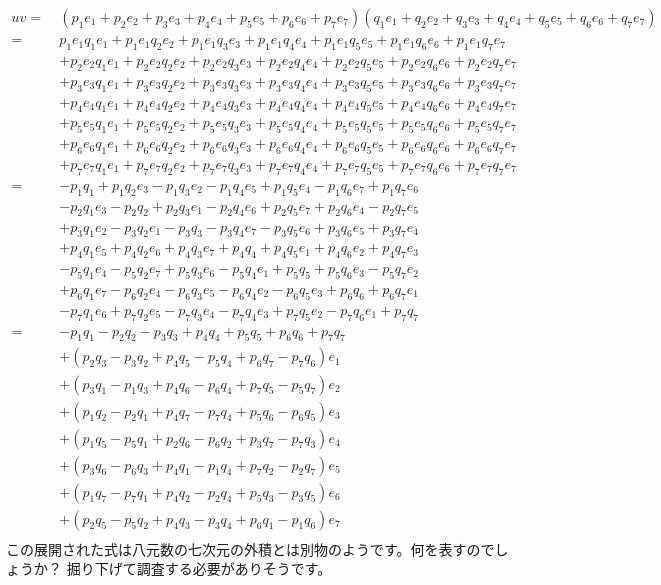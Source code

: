 \documentclass[a4paper,12pt,notitlepage]{jsreport}
\begin{document}
\begin{equation}
  \begin{split}
    uv=~&(p_1e_1+p_2e_2+p_3e_3+p_4e_4+p_5e_5+p_6e_6+p_7e_7)(q_1e_1+q_2e_2+q_3e_3+q_4e_4+q_5e_5+q_6e_6+q_7e_7)\\
    =~&p_1e_1q_1e_1+p_1e_1q_2e_2+p_1e_1q_3e_3+p_1e_1q_4e_4+p_1e_1q_5e_5+p_1e_1q_6e_6+p_1e_1q_7e_7\\
    &+p_2e_2q_1e_1+p_2e_2q_2e_2+p_2e_2q_3e_3+p_2e_2q_4e_4+p_2e_2q_5e_5+p_2e_2q_6e_6+p_2e_2q_7e_7\\
    &+p_3e_3q_1e_1+p_3e_3q_2e_2+p_3e_3q_3e_3+p_3e_3q_4e_4+p_3e_3q_5e_5+p_3e_3q_6e_6+p_3e_3q_7e_7\\
    &+p_4e_4q_1e_1+p_4e_4q_2e_2+p_4e_4q_3e_3+p_4e_4q_4e_4+p_4e_4q_5e_5+p_4e_4q_6e_6+p_4e_4q_7e_7\\
    &+p_5e_5q_1e_1+p_5e_5q_2e_2+p_5e_5q_3e_3+p_5e_5q_4e_4+p_5e_5q_5e_5+p_5e_5q_6e_6+p_5e_5q_7e_7\\
    &+p_6e_6q_1e_1+p_6e_6q_2e_2+p_6e_6q_3e_3+p_6e_6q_4e_4+p_6e_6q_5e_5+p_6e_6q_6e_6+p_6e_6q_7e_7\\
    &+p_7e_7q_1e_1+p_7e_7q_2e_2+p_7e_7q_3e_3+p_7e_7q_4e_4+p_7e_7q_5e_5+p_7e_7q_6e_6+p_7e_7q_7e_7\\
    =~&-p_1q_1+p_1q_2e_3-p_1q_3e_2-p_1q_4e_5+p_1q_5e_4-p_1q_6e_7+p_1q_7e_6\\
    &-p_2q_1e_3-p_2q_2+p_2q_3e_1-p_2q_4e_6+p_2q_5e_7+p_2q_6e_4-p_2q_7e_5\\
    &+p_3q_1e_2-p_3q_2e_1-p_3q_3-p_3q_4e_7-p_3q_5e_6+p_3q_6e_5+p_3q_7e_4\\
    &+p_4q_1e_5+p_4q_2e_6+p_4q_3e_7+p_4q_4+p_4q_5e_1+p_4q_6e_2+p_4q_7e_3\\
    &-p_5q_1e_4-p_5q_2e_7+p_5q_3e_6-p_5q_4e_1+p_5q_5+p_5q_6e_3-p_5q_7e_2\\
    &+p_6q_1e_7-p_6q_2e_4-p_6q_3e_5-p_6q_4e_2-p_6q_5e_3+p_6q_6+p_6q_7e_1\\
    &-p_7q_1e_6+p_7q_2e_5-p_7q_3e_4-p_7q_4e_3+p_7q_5e_2-p_7q_6e_1+p_7q_7\\
    =~&-p_1q_1-p_2q_2-p_3q_3+p_4q_4+p_5q_5+p_6q_6+p_7q_7\\
    &+(p_2q_3-p_3q_2+p_4q_5-p_5q_4+p_6q_7-p_7q_6)e_1\\
    &+(p_3q_1-p_1q_3+p_4q_6-p_6q_4+p_7q_5-p_5q_7)e_2\\
    &+(p_1q_2-p_2q_1+p_4q_7-p_7q_4+p_5q_6-p_6q_5)e_3\\
    &+(p_1q_5-p_5q_1+p_2q_6-p_6q_2+p_3q_7-p_7q_3)e_4\\
    &+(p_3q_6-p_6q_3+p_4q_1-p_1q_4+p_7q_2-p_2q_7)e_5\\
    &+(p_1q_7-p_7q_1+p_4q_2-p_2q_4+p_5q_3-p_3q_5)e_6\\
    &+(p_2q_5-p_5q_2+p_4q_3-p_3q_4+p_6q_1-p_1q_6)e_7\\
  \end{split}
\end{equation}
この展開された式は八元数の七次元の外積とは別物のようです。何を表すのでしょうか？
掘り下げて調査する必要がありそうです。
\end{document}
